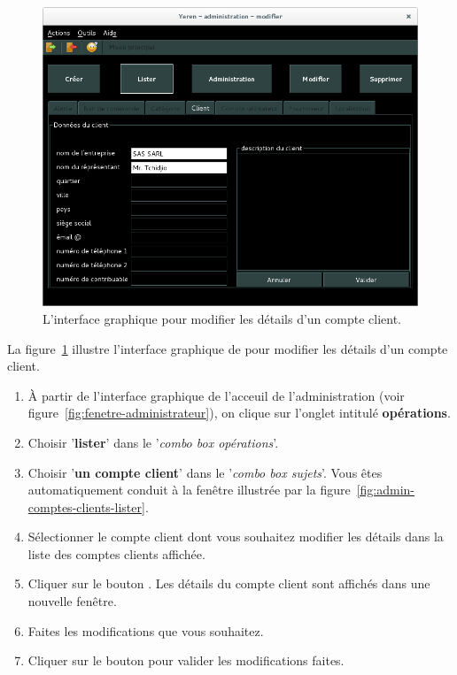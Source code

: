 \begin{figure}[!htpb]
	\centering
	\includegraphics[scale=0.45]{images/compte-client-modifier.png}
	\caption{L'interface graphique pour modifier les d\'etails
			d'un compte client.}
	\label{fig:admin-comptes-clients-modifier}
\end{figure}

La figure~\ref{fig:admin-comptes-clients-modifier} illustre
l'interface graphique de \yeren pour modifier les
d\'etails d'un compte client.

\begin{enumerate}[1)]
	\item \`A partir de l'interface graphique de l'acceuil de
		l'administration (voir figure~\ref{fig:fenetre-administrateur}),
		on clique sur l'onglet intitul\'e \textbf{op\'erations}. 
		
	\item Choisir '\textbf{lister}' dans le '\emph{combo box
		op\'erations}'.
		
	\item Choisir '\textbf{un compte client}' dans le '\emph{combo box
		sujets}'. Vous \^etes automatiquement conduit \`a la fen\^etre
		illustr\'ee par la figure~\ref{fig:admin-comptes-clients-lister}.
		
	\item S\'electionner le compte client dont vous souhaitez
		modifier les d\'etails dans la liste des comptes
		clients affich\'ee.
		
	\item Cliquer sur le bouton . Les d\'etails
		du compte client sont affich\'es dans une nouvelle fen\^etre.
		
	\item Faites les modifications que vous souhaitez.
		
	\item Cliquer sur le bouton  pour valider
		les modifications faites.
\end{enumerate}

